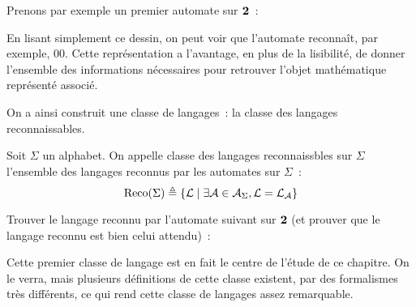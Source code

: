 Prenons par exemple un premier automate sur $\boldsymbol{2}$~:

\begin{figure}[h]
  \centering
\end{figure}

En lisant simplement ce dessin, on peut voir que l'automate reconnaît, par
exemple, $00$. Cette représentation a l'avantage, en plus de la lisibilité,
de donner l'ensemble des informations nécessaires pour retrouver l'objet
mathématique représenté associé.

On a ainsi construit une classe de langages~: la classe des langages
reconnaissables.

\begin{definition}
  Soit $\Sigma$ un alphabet. On appelle classe des langages reconnaissbles sur
  $\Sigma$ l'ensemble des langages reconnus par les automates sur $\Sigma$~:
  \[\operatorname{Reco}(\Sigma) \triangleq \{\mathcal L \mid
  \exists \mathcal A \in \mathcal A_\Sigma, \mathcal L = \mathcal L_\mathcal A\}\]
\end{definition}

\begin{exercise}
  Trouver le langage reconnu par l'automate suivant sur $\boldsymbol{2}$ (et prouver que
  le langage reconnu est bien celui attendu)~:
  \begin{figure}[h]
    \centering
  \end{figure}
\end{exercise}

Cette premier classe de langage est en fait le centre de l'étude de ce chapitre.
On le verra, mais plusieurs définitions de cette classe existent, par des
formalismes très différents, ce qui rend cette classe de langages assez
remarquable.

